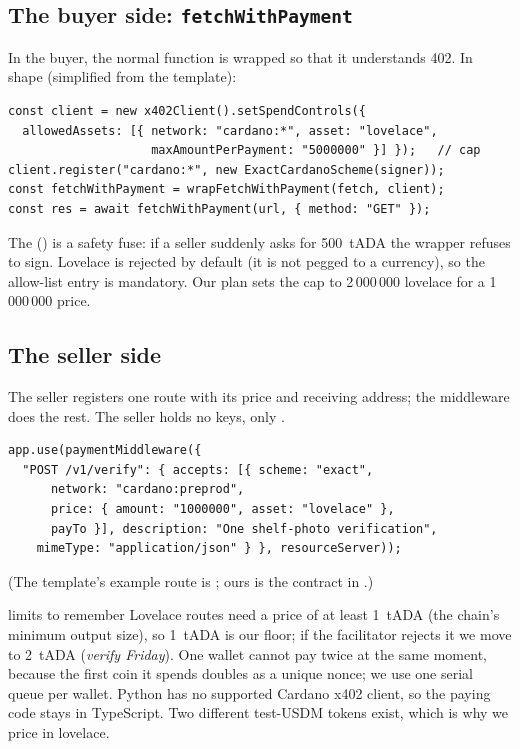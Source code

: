 \subsection{The buyer side: \texttt{fetchWithPayment}}
In the buyer, the normal  function is wrapped so that it understands 402. In shape (simplified from the template):
\begin{lstlisting}
const client = new x402Client().setSpendControls({
  allowedAssets: [{ network: "cardano:*", asset: "lovelace",
                    maxAmountPerPayment: "5000000" }] });   // cap
client.register("cardano:*", new ExactCardanoScheme(signer));
const fetchWithPayment = wrapFetchWithPayment(fetch, client);
const res = await fetchWithPayment(url, { method: "GET" });
\end{lstlisting}
The  () is a safety fuse: if a seller suddenly asks for 500~tADA the wrapper refuses to sign. Lovelace is rejected by default (it is not pegged to a currency), so the allow-list entry is mandatory. Our plan sets the cap to 2\,000\,000 lovelace for a 1\,000\,000 price.

\subsection{The seller side}
The seller registers one route with its price and receiving address; the middleware does the rest. The seller holds no keys, only .
\begin{lstlisting}
app.use(paymentMiddleware({
  "POST /v1/verify": { accepts: [{ scheme: "exact",
      network: "cardano:preprod",
      price: { amount: "1000000", asset: "lovelace" },
      payTo }], description: "One shelf-photo verification",
    mimeType: "application/json" } }, resourceServer));
\end{lstlisting}
(The template's example route is ; ours is the contract in .)

\begin{warningbox}{limits to remember}
Lovelace routes need a price of at least 1~tADA (the chain's minimum output size), so 1~tADA is our floor; if the facilitator rejects it we move to 2~tADA (\emph{verify Friday}). One wallet cannot pay twice at the same moment, because the first coin it spends doubles as a unique nonce; we use one serial queue per wallet. Python has no supported Cardano x402 client, so the paying code stays in TypeScript. Two different test-USDM tokens exist, which is why we price in lovelace.
\end{warningbox}

